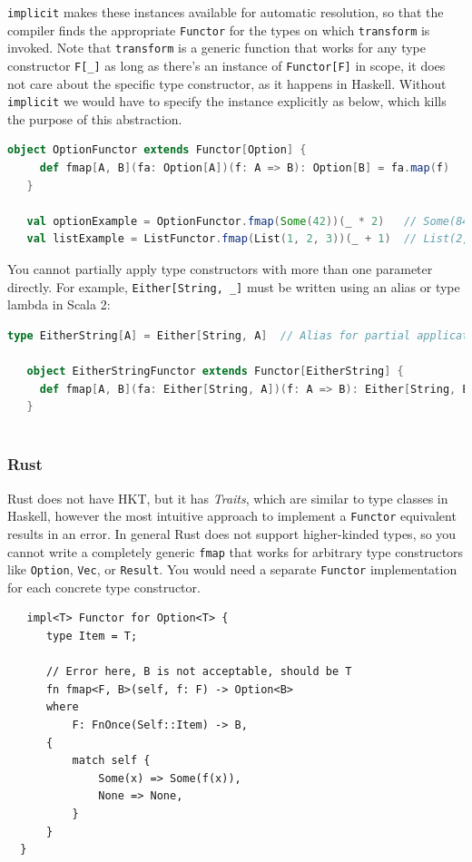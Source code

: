 \lstinline|implicit| makes these instances available for automatic resolution, so that the compiler finds the appropriate \lstinline|Functor| for the types on which \lstinline|transform| is invoked.
Note that \lstinline|transform| is a generic function that works for any type constructor \lstinline|F[_]| as long as there's an instance of \lstinline|Functor[F]| in scope, it does not care about the specific type constructor, as it happens in Haskell.
Without \lstinline|implicit| we would have to specify the instance explicitly as below, which kills the purpose of this abstraction.
\begin{lstlisting}[language=Scala]
   object OptionFunctor extends Functor[Option] {
     def fmap[A, B](fa: Option[A])(f: A => B): Option[B] = fa.map(f)
   }
   
   val optionExample = OptionFunctor.fmap(Some(42))(_ * 2)   // Some(84
   val listExample = ListFunctor.fmap(List(1, 2, 3))(_ + 1)  // List(2, 3, 4)
\end{lstlisting}

You cannot partially apply type constructors with more than one parameter directly. For example, \lstinline|Either[String, _]| must be written using an alias or type lambda in Scala 2:
\begin{lstlisting}[language=Scala]
   type EitherString[A] = Either[String, A]  // Alias for partial application

   object EitherStringFunctor extends Functor[EitherString] {
     def fmap[A, B](fa: Either[String, A])(f: A => B): Either[String, B] = fa.map(f)
   }
   
\end{lstlisting}

\subsubsection{Rust}
\label{sec:rust_hkt}
Rust does not have HKT, but it has \textit{Traits}, which are similar to type classes in Haskell,
however the most intuitive approach to implement a \lstinline|Functor| equivalent results in an error. In general Rust does not support higher-kinded types, so you cannot write a completely generic \lstinline|fmap| that works for arbitrary type constructors like \lstinline|Option|, \lstinline|Vec|, or \lstinline|Result|. You would need a separate \lstinline|Functor| implementation for each concrete type constructor. \frownie
\begin{lstlisting}
   impl<T> Functor for Option<T> {
      type Item = T;
  
      // Error here, B is not acceptable, should be T
      fn fmap<F, B>(self, f: F) -> Option<B>
      where
          F: FnOnce(Self::Item) -> B,
      {
          match self {
              Some(x) => Some(f(x)),
              None => None,
          }
      }
  }
\end{lstlisting}


